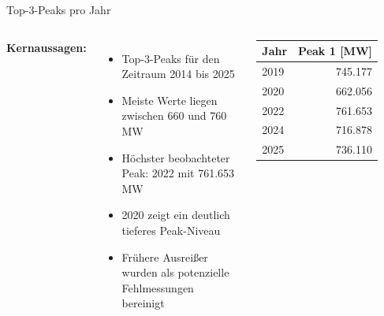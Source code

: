 \documentclass{beamer}
\begin{document}
\begin{frame}{Top-3-Peaks pro Jahr}
  \begin{columns}[T]
    \textbf{Kernaussagen:}
    \begin{itemize}
      \item Top-3-Peaks für den Zeitraum 2014 bis 2025
      \item Meiste Werte liegen zwischen 660 und 760 MW
      \item Höchster beobachteter Peak: 2022 mit 761.653 MW
      \item 2020 zeigt ein deutlich tieferes Peak-Niveau
      \item Frühere Ausreißer wurden als potenzielle Fehlmessungen bereinigt
    \end{itemize}

    \begin{table}[H]
      \scriptsize
      \centering
      \begin{tabular}{lr}
        \toprule
        Jahr & Peak 1 [MW] \\
        \midrule
        2019 & 745.177 \\
        2020 & 662.056 \\
        2022 & 761.653 \\
        2024 & 716.878 \\
        2025 & 736.110 \\
        \bottomrule
      \end{tabular}
    \end{table}
  \end{columns}
\end{frame}
\end{document}

